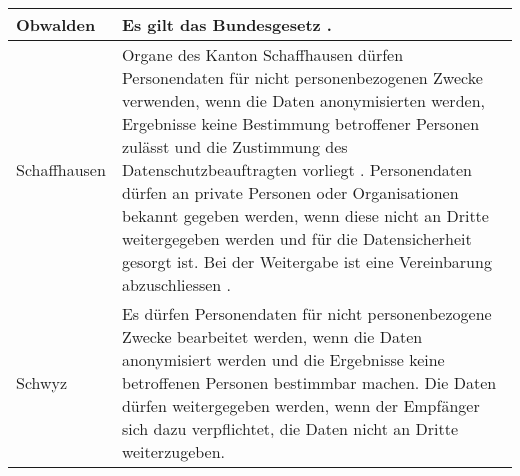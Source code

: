 \begin{longtable}{| p{} | p{}|}
		\hline
		Obwalden & Es gilt das Bundesgesetz \parencite{DSSGOW}. \\
		\hline
		Schaffhausen & Organe des Kanton Schaffhausen dürfen Personendaten für nicht personenbezogenen Zwecke verwenden, wenn die Daten anonymisierten werden, Ergebnisse keine Bestimmung betroffener Personen zulässt und die Zustimmung des Datenschutzbeauftragten vorliegt \parencite[§§ 12 Abs. 1]{DSSGSH}. Personendaten dürfen an private Personen oder Organisationen bekannt gegeben werden, wenn diese nicht an Dritte weitergegeben werden und für die Datensicherheit gesorgt ist. Bei der Weitergabe ist eine Vereinbarung abzuschliessen \parencite[§§ 12 Abs 2]{DSSGSH}. \\
		\hline
    Schwyz & Es dürfen Personendaten für nicht personenbezogene Zwecke bearbeitet werden, wenn die Daten anonymisiert werden und die Ergebnisse keine betroffenen Personen bestimmbar machen. Die Daten dürfen weitergegeben werden, wenn der Empfänger sich dazu verpflichtet, die Daten nicht an Dritte weiterzugeben. \parencite[§§ 14 Abs 1-2]{DSSGSZ} \\


\end{longtable}
